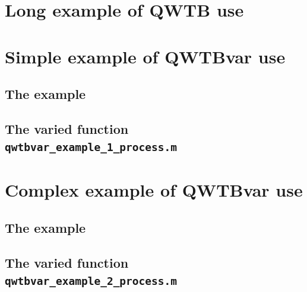 \documentclass[12pt,a4paper,oneside]{report} %
\begin{document}
\chapter{Long example of QWTB use} %
\stopcontents[maintoc]

\resumecontents[maintoc]

\chapter{Simple example of QWTBvar use} %
\section{The example}
\stopcontents[maintoc]

\resumecontents[maintoc]
\section{The varied function \texttt{qwtbvar\_example\_1\_process.m}}


\chapter{Complex example of QWTBvar use} %
\section{The example}
\stopcontents[maintoc]

\resumecontents[maintoc]
\section{The varied function \texttt{qwtbvar\_example\_2\_process.m}}

\end{document}
